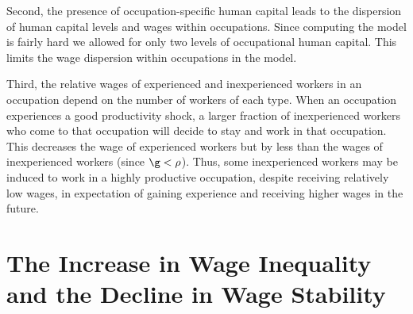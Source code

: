 \documentclass[12pt]{article}
\newcommand{\CiteReference}{../reference.bib}
\theoremstyle{definition}
\begin{document}
Second, the presence of occupation-specific human capital leads to the dispersion of human capital levels and wages within occupations. Since computing the model is fairly hard we allowed for only two levels of occupational human capital. This limits the wage dispersion within occupations in the model.

Third, the relative wages of experienced and inexperienced workers in an occupation depend on the number of workers of each type. When an occupation experiences a good productivity shock, a larger fraction of inexperienced workers who come to that occupation will decide to stay and work in that occupation. This decreases the wage of experienced workers but by less than the wages of inexperienced workers (since $\g < \rho$). Thus, some inexperienced workers may be induced to work in a highly productive occupation, despite receiving relatively low wages, in expectation of gaining experience and receiving higher wages in the future.


\section{The Increase in Wage Inequality and the Decline in Wage Stability}














\end{document}
